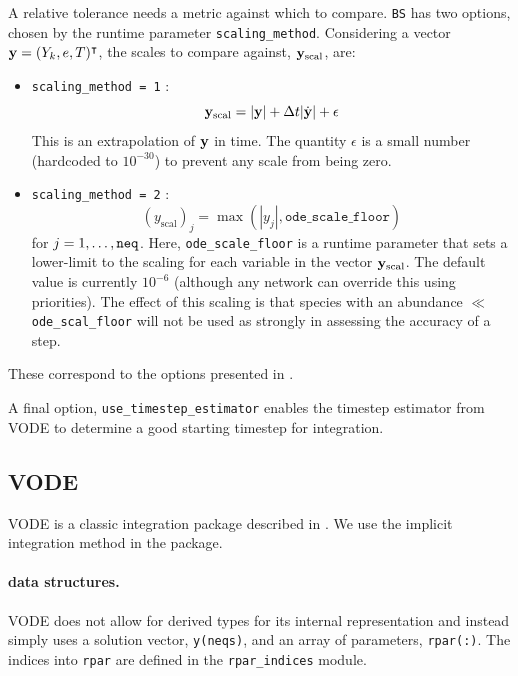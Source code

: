 A relative tolerance needs a metric against which to compare.  {\tt BS}
has two options, chosen by the runtime parameter {\tt scaling\_method}.
Considering a vector ${\bf y} = (Y_k, e, T)^\intercal$, the scales
to compare against, ${\bf y}_\mathrm{scal}$, are:
\begin{itemize}
\item {\tt scaling\_method = 1} :
\begin{equation}
{\bf y}_\mathrm{scal} = |{\bf y}| + \Delta t  |\dot{\bf y}| + \epsilon
\end{equation}
This is an extrapolation of ${\bf y}$ in time.  The quantity
$\epsilon$ is a small number (hardcoded to $10^{-30}$) to prevent any
scale from being zero.


\item{\tt scaling\_method = 2} :
\begin{equation}
({y}_\mathrm{scal})_j = \max \left (|y_j|, \mathtt{ode\_scale\_floor} \right )
\end{equation}
for $j = 1, \ldots, {\tt neq}$.  Here, {\tt ode\_scale\_floor} is a runtime
parameter that sets a lower-limit to the scaling for each variable in the
vector ${\bf y}_\mathrm{scal}$.  The default value is currently $10^{-6}$
(although any network can override this using priorities).  The effect of
this scaling is that species with an abundance $\ll$ {\tt ode\_scal\_floor}
will not be used as strongly in assessing the accuracy of a step.

\end{itemize}
These correspond to the options presented in \cite{NR}.

A final option, {\tt use\_timestep\_estimator} enables the
timestep estimator from VODE to determine a good starting
timestep for integration.

\subsection{VODE}
\label{sec:VODE}

VODE is a classic integration package described in \cite{vode}.  We
use the implicit integration method in the package.


\paragraph{data structures.}  VODE does not allow for derived types 
for its internal representation and instead simply uses a solution
vector, {\tt y(neqs)}, and an array of parameters, {\tt rpar(:)}.  The
indices into {\tt rpar} are defined in the {\tt rpar\_indices} module.


